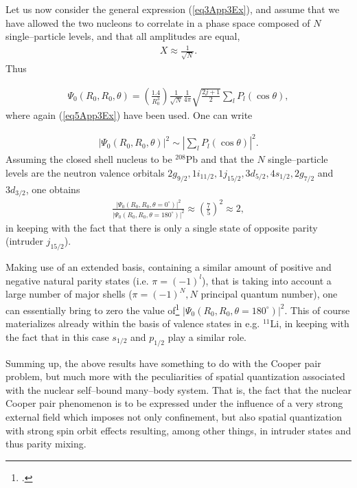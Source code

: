 \begin{subappendices}
Let us now consider the general expression (\ref{eq3App3Ex}), and assume that we have allowed the two nucleons to correlate in a phase space composed of $N$ single--particle levels, and that all amplitudes are equal,
 \begin{align}\label{eq8App3E}
X\approx\frac{1}{\sqrt{N}}.
 \end{align}
Thus 

 \begin{align}\label{eq9App3E}
\Psi_0(R_0,R_0,\theta)
=\left(\frac{1.4}{R_0^3}\right)\frac{1}{\sqrt{N}}\frac{1}{4\pi}\sqrt{\frac{2j+1}{2}}\sum_lP_l(\cos\theta),
 \end{align}
where again (\ref{eq5App3Ex}) have been used. One can write 

\begin{align}\label{eq10App3E}
|\Psi_0(R_0,R_0,\theta)|^2\sim |\sum_lP_l(\cos\theta)|^2.
\end{align}
Assuming the closed shell nucleus to be $^{208}$Pb and that the $N$ single--particle levels are the neutron valence orbitals $2g_{9/2},1i_{11/2},1j_{15/2},3d_{5/2},4s_{1/2},2g_{7/2}$ and $3d_{3/2}$, one obtains
\begin{align}\label{eq11App3E}
\frac{|\Psi_0(R_0,R_0,\theta=0^\circ)|^2}{|\Psi_0(R_0,R_0,\theta=180^\circ)|^2}\approx\left(\frac{7}{5}\right)^2\approx2,
\end{align}
in keeping with the fact that there is only a single state of opposite parity (intruder $j_{15/2}$).

Making use of an extended basis, containing a similar amount of positive and negative natural parity states (i.e. $\pi=(-1)^l$), that is taking into account a large number of major shells ($\pi=(-1)^N, N$ principal quantum number), one can essentially bring to zero the value of\footnote{\cite{Ferreira:84}.} $|\Psi_0(R_0,R_0,\theta=180^\circ)|^2$.
This of course materializes already within the basis of valence states in e.g. $^{11}$Li, in keeping with the fact that in this case $s_{1/2}$ and $p_{1/2}$ play a similar role. 


Summing up, the above results have something to do with the Cooper pair problem, but much more with the peculiarities of spatial quantization associated with the nuclear self--bound many--body system. That is, the fact that the nuclear Cooper pair phenomenon  is to be expressed under the influence of a very strong external field which imposes not only confinement, but also spatial quantization with strong spin orbit effects resulting, among other things, in intruder states and thus parity mixing.   






\end{subappendices}



\clearpage
\newpage
















 
%
%


